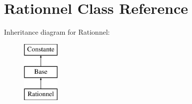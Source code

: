 \hypertarget{class_rationnel}{\section{Rationnel Class Reference}
\label{class_rationnel}
}
Inheritance diagram for Rationnel\-:\begin{figure}[H]
\begin{center}
\leavevmode
\includegraphics[height=3.000000cm]{class_rationnel}
\end{center}
\end{figure}

